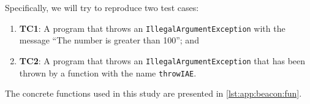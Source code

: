     Specifically, we will try to reproduce two test cases:

    \begin{enumerate}
        \item \textbf{TC1}: A program that throws an \texttt{IllegalArgumentException} with the message \enquote{The 
            number is greater than 100}; and
        \item \textbf{TC2}: A program that throws an \texttt{IllegalArgumentException} that has been thrown by a 
            function with the name \texttt{throwIAE}.
    \end{enumerate}
    
    The concrete functions used in this study are presented in \vref{lst:app:beacon:fun}.
